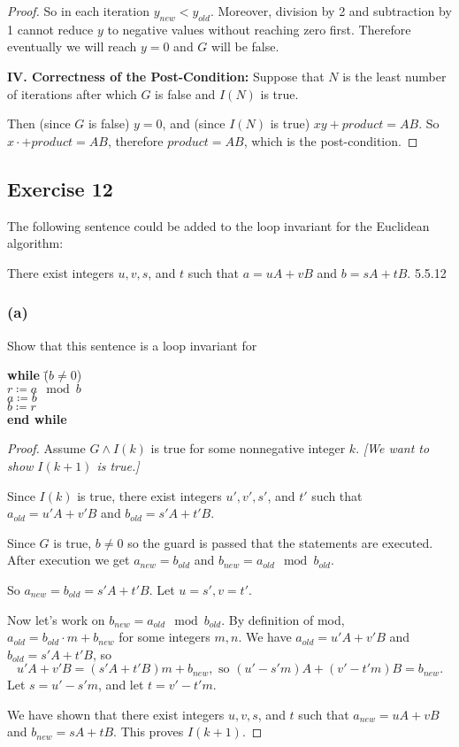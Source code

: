 \documentclass[14pt]{extarticle}
\newcommand{\cy}{\color{cyan}}
\begin{document}
\begin{proof}
    So in each iteration $y_{new} < y_{old}$. Moreover, division by 2 and subtraction by 1 cannot reduce $y$ to
    negative values without reaching zero first. Therefore eventually we will reach $y = 0$ and $G$ will be false.

        {\bf IV. Correctness of the Post-Condition:} Suppose that $N$ is the least number of iterations after which $G$ is false and $I(N)$ is true.

    Then (since $G$ is false) $y = 0$, and (since $I(N)$ is true) $xy + product = AB$. So $x \cdot + product = AB$,
    therefore $product = AB$, which is the post-condition.
\end{proof}

\subsection{Exercise 12}
The following sentence could be added to the loop invariant for the Euclidean algorithm:

There exist integers $u, v, s$, and $t$ such that $a = uA + vB$ and $b = sA + tB$. {\cy 5.5.12}

\subsubsection{(a)}
Show that this sentence is a loop invariant for
\begin{tabbing}
    {\bf while} \= ($b \neq 0$) \\
    \> $r \coloneqq a \mod b$ \\
    \> $a \coloneqq b$ \\
    \> $b \coloneqq r$ \\
    {\bf end while}
\end{tabbing}

\begin{proof}
    Assume $G \wedge I(k)$ is true for some nonnegative integer $k$. {\it [We want to show $I(k+1)$ is true.]}

    Since $I(k)$ is true, there exist integers $u', v', s'$, and $t'$ such that $a_{old} = u'A + v'B$ and $b_{old} = s'A + t'B$.

    Since $G$ is true, $b \neq 0$ so the guard is passed that the statements are executed. After execution we get
    $a_{new} = b_{old}$ and $b_{new} = a_{old} \mod b_{old}$.

    So $a_{new} = b_{old} = s'A + t'B$. Let $u = s', v = t'$.

    Now let's work on $b_{new} = a_{old} \mod b_{old}$. By definition of mod, \(a_{old} = b_{old} \cdot m + b_{new}\)
    for some integers $m,n$. We have $a_{old} = u'A + v'B$ and $b_{old} = s'A + t'B$, so
    \[
        u'A + v'B = (s'A + t'B)m + b_{new}, \text{ so } (u'-s'm)A + (v'-t'm)B = b_{new}.
    \]
    Let $s = u'-s'm$, and let $t = v'-t'm$.

    We have shown that there exist integers $u, v, s$, and $t$ such that $a_{new} = uA + vB$ and $b_{new} = sA + tB$.
    This proves $I(k+1)$.
\end{proof}
\end{document}
